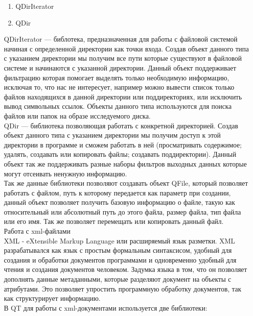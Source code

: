 \begin{enumerate}
\item QDirIterator
\item QDir
\end{enumerate}

QDirIterator — библотека, предназначенная для работы с файловой системой начиная с определенной директории как точки входа. Создав объект данного типа с указанием директории мы получим все пути которые существуют в файловой системе и начинаются с указанной директории. Данный объект поддерживает фильтрацию которая помогает выделять только необходимую информацию, исключая то, что нас не интересует, например можно вывести список только файлов находящихся в данной директории или поддиректориях, или исключить вывод символьных ссылок. Объекты данного типа используются для поиска файлов или папок на образе исследуемого диска. \\

QDir — библиотека позволяющая работать с конкретной директорией. Создав объект данного типа с указанием директории мы получим доступ к этой директории в программе и сможем работать в ней (просматривать содержимое; удалять, создавать или копировать файлы; создавать поддиректории). Данный объект так же поддерживать разные наборы фильтров выходных данных которые могут отсеивать ненужную информацию. \\

Так же данные библиотеки позволяют создавать объект QFile, который позволяет работать с файлом, путь к которому передается как параметр при создании, данный объект позволяет получить базовую информацию о файле, такую как относительный или абсолютный путь до этого файла, размер файла, тип файла или его имя. Так же позволяет перемещать или копировать данный файл.\\

Работа с xml-файлами \\

XML - eXtensible Markup Language или расширяемый язык разметки. XML разрабатывался как язык с простым формальным синтаксисом, удобный для создания и обработки документов программами и одновременно удобный для чтения и создания документов человеком. Задумка языка в том, что он позволяет дополнять данные метаданными, которые разделяют документ на объекты с атрибутами. Это позволяет упростить программную обработку документов, так как структурирует информацию. \\

В QT для работы с xml-документами используется две библиотеки: \\

